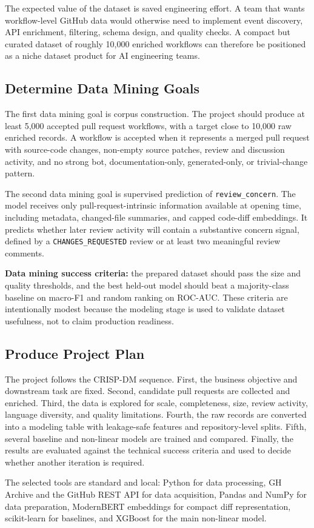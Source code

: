 The expected value of the dataset is saved engineering effort. A team that wants workflow-level GitHub data would otherwise need to implement event discovery, API enrichment, filtering, schema design, and quality checks. A compact but curated dataset of roughly 10,000 enriched workflows can therefore be positioned as a niche dataset product for AI engineering teams.

\subsection{Determine Data Mining Goals}

The first data mining goal is corpus construction. The project should produce at least 5,000 accepted pull request workflows, with a target close to 10,000 raw enriched records. A workflow is accepted when it represents a merged pull request with source-code changes, non-empty source patches, review and discussion activity, and no strong bot, documentation-only, generated-only, or trivial-change pattern.

The second data mining goal is supervised prediction of \texttt{review\_concern}. The model receives only pull-request-intrinsic information available at opening time, including metadata, changed-file summaries, and capped code-diff embeddings. It predicts whether later review activity will contain a substantive concern signal, defined by a \texttt{CHANGES\_REQUESTED} review or at least two meaningful review comments.

\textbf{Data mining success criteria:} the prepared dataset should pass the size and quality thresholds, and the best held-out model should beat a majority-class baseline on macro-F1 and random ranking on ROC-AUC. These criteria are intentionally modest because the modeling stage is used to validate dataset usefulness, not to claim production readiness.

\subsection{Produce Project Plan}

The project follows the CRISP-DM sequence. First, the business objective and downstream task are fixed. Second, candidate pull requests are collected and enriched. Third, the data is explored for scale, completeness, size, review activity, language diversity, and quality limitations. Fourth, the raw records are converted into a modeling table with leakage-safe features and repository-level splits. Fifth, several baseline and non-linear models are trained and compared. Finally, the results are evaluated against the technical success criteria and used to decide whether another iteration is required.

The selected tools are standard and local: Python for data processing, GH Archive and the GitHub REST API for data acquisition, Pandas and NumPy for data preparation, ModernBERT embeddings for compact diff representation, scikit-learn for baselines, and XGBoost for the main non-linear model.
